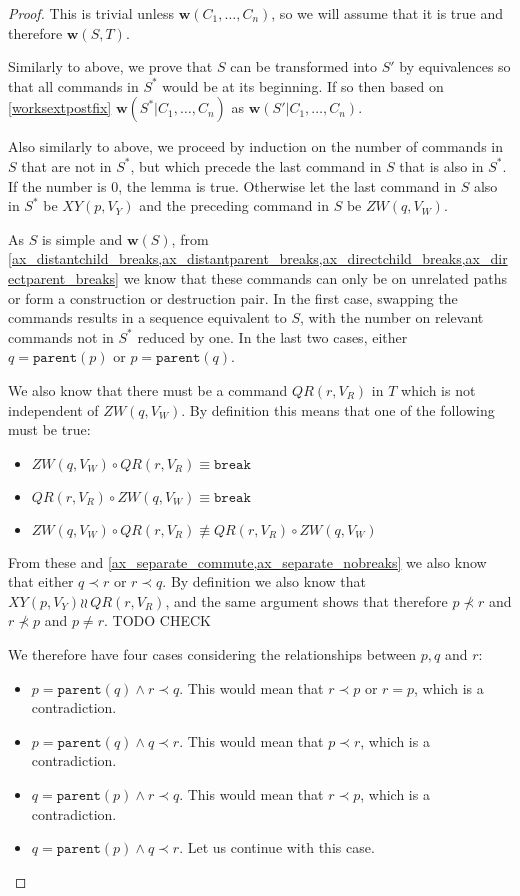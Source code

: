 \documentclass[12pt]{article}
\newcommand{\parent}{\mathtt{parent}}
\newcommand{\cbrk}{\mathtt{break}}
\newcommand{\fscommand}[2]{{#1#2}}
\newcommand{\cxy}{\fscommand{X}{Y}}
\newcommand{\czw}{\fscommand{Z}{W}}
\newcommand{\cqr}{\fscommand{Q}{R}}
\newcommand{\cc}{\circ}
\newcommand{\descendant}{\prec}
\newcommand{\nequiv}{\not\equiv}
\newcommand{\indep}{\wr\!\!\wr\,} %
\newcommand{\works}[1]{{\mathbf{w}}({#1})}
\newcommand{\worksc}[2]{{\mathbf{w}}({#1}|{#2})}
\theoremstyle{definition}
\begin{document}
\begin{proof}
This is trivial unless $\works{C_1,\ldots,C_n}$, so we will assume that it is true
and therefore $\works{S,T}$.

Similarly to above, we prove that $S$ can be transformed into $S'$ by equivalences
so that all commands in $S^*$ would be at its beginning.
If so then based on \cref{worksextpostfix}
$\worksc{S^*}{C_1,\ldots,C_n}$ as $\worksc{S'}{C_1,\ldots,C_n}$.

Also similarly to above,
we proceed by induction on the number of commands in $S$ that are not in $S^*$, but which precede
the last command in $S$ that is also in $S^*$.
If the number is 0, the lemma is true.
Otherwise let the last command in $S$ also in $S^*$ be $\cxy(p,V_Y)$
and the preceding command in $S$ be $\czw(q,V_W)$.

As $S$ is simple and $\works{S}$, from 
\cref{ax_distantchild_breaks,ax_distantparent_breaks,ax_directchild_breaks,ax_directparent_breaks}
we know that these commands can only be on unrelated paths or form a construction or destruction pair.
In the first case, swapping the commands results in a sequence equivalent to $S$,
with the number on relevant commands not in $S^*$ reduced by one.
In the last two cases,
either $q=\parent(p)$ or $p=\parent(q)$.

We also know that there must be a command $\cqr(r,V_R)$ in $T$ which is not independent of $\czw(q,V_W)$.
By definition this means that one of the following must be true:
\begin{itemize}
\item $\czw(q,V_W)\cc \cqr(r,V_R) \equiv\cbrk$
\item $\cqr(r,V_R)\cc \czw(q,V_W) \equiv\cbrk$
\item $\czw(q,V_W)\cc \cqr(r,V_R) \nequiv \cqr(r,V_R)\cc \czw(q,V_W)$
\end{itemize}
From these and \cref{ax_separate_commute,ax_separate_nobreaks} we also know that
either $q\descendant r$ or $r\descendant q$.
By definition we also know that $\cxy(p,V_Y)\indep \cqr(r,V_R)$,
and the same argument shows that therefore
$p\not\descendant r$ and $r\not\descendant p$ and $p\neq r$. TODO CHECK

We therefore have four cases considering the relationships between $p,q$ and $r$:
\begin{itemize}
\item $p=\parent(q) \wedge r\descendant q$.
   This would mean that $r\descendant p$ or $r=p$, which is a contradiction.
\item $p=\parent(q) \wedge q\descendant r$.
   This would mean that $p\descendant r$, which is a contradiction.
\item $q=\parent(p) \wedge r\descendant q$.
   This would mean that $r\descendant p$, which is a contradiction.  
\item $q=\parent(p) \wedge q\descendant r$.
   Let us continue with this case.
\end{itemize}


\end{proof}
\end{document}
